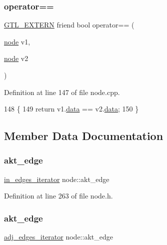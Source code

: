 \subsubsection{\texorpdfstring{operator==}{operator==}}
{\footnotesize\ttfamily \mbox{\hyperlink{_g_t_l_8h_a014cd1e9b3e67a78ae433eda95c8fd25}{G\+T\+L\+\_\+\+E\+X\+T\+E\+RN}} friend bool operator== (\begin{DoxyParamCaption}\item[{\mbox{\hyperlink{classnode}{node}}}]{v1,  }\item[{\mbox{\hyperlink{classnode}{node}}}]{v2 }\end{DoxyParamCaption})\hspace{0.3cm}{\ttfamily [friend]}}



Definition at line 147 of file node.\+cpp.


\begin{DoxyCode}
148 \{
149     \textcolor{keywordflow}{return} v1.\mbox{\hyperlink{classnode_a4ae3d54ebb61be3a102bedf5b91bef75}{data}} == v2.\mbox{\hyperlink{classnode_a4ae3d54ebb61be3a102bedf5b91bef75}{data}};
150 \}
\end{DoxyCode}


\subsection{Member Data Documentation}
\mbox{\label{classnode_adea0d78e10bae12b86a65f27d1aa98c7}} 
\subsubsection{\texorpdfstring{akt\+\_\+edge}{akt\_edge}\hspace{0.1cm}{\footnotesize\ttfamily [1/2]}}
{\footnotesize\ttfamily \mbox{\hyperlink{classnode_a9a96be92add7c1a2771bcd0431ebf8ab}{in\+\_\+edges\+\_\+iterator}} node\+::akt\+\_\+edge\hspace{0.3cm}{\ttfamily [private]}}



Definition at line 263 of file node.\+h.

\mbox{\label{classnode_a56cf4b809cc3b1a7f03327caff125d52}} 
\subsubsection{\texorpdfstring{akt\+\_\+edge}{akt\_edge}\hspace{0.1cm}{\footnotesize\ttfamily [2/2]}}
{\footnotesize\ttfamily \mbox{\hyperlink{classnode_abdd49248203010f2d5432dfef22d017a}{adj\+\_\+edges\+\_\+iterator}} node\+::akt\+\_\+edge\hspace{0.3cm}{\ttfamily [private]}}



